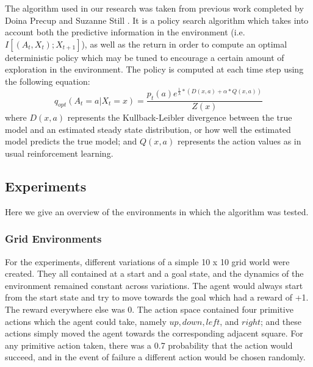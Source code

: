 \documentclass{acm_proc_article-sp}
\begin{document}

The algorithm used in our research was taken from previous work completed by Doina Precup and Suzanne Still \cite{still}. It is a policy search algorithm which takes into account both the predictive information in the environment (i.e. $I[(A_t,X_t); X_{t+1}]$), as well as the return in order to compute an optimal deterministic policy which may be tuned to encourage a certain amount of exploration in the environment. The policy is computed at each time step using the following equation: $$q_{opt}(A_t = a| X_t = x) = \frac{p_t(a)e^{\frac{1}{\lambda}*(D(x,a) + \alpha*Q(x,a))}}{Z(x)}$$ where $D(x,a)$ represents the Kullback-Leibler divergence between the true model and an estimated steady state distribution, or how well the estimated model predicts the true model; and $Q(x,a)$ represents the action values as in usual reinforcement learning.

\subsection{Experiments}


Here we give an overview of the environments in which the algorithm was tested.

\subsubsection{Grid Environments}


For the experiments, different variations of a simple 10 x 10 grid world were created. They all contained at a start and a goal state, and the dynamics of the environment remained constant across variations. The agent would always start from the start state and try to move towards the goal which had a reward of +1. The reward everywhere else was 0. The action space contained four primitive actions which the agent could take, namely $up, down, left$, and $right$; and these actions simply moved the agent towards the corresponding adjacent square. For any primitive action taken, there was a 0.7 probability that the action would succeed, and in the event of failure a different action would be chosen randomly. 

\end{document}
